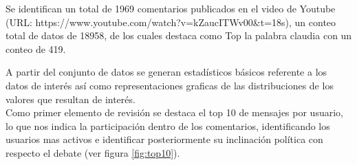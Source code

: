 Se identifican un total de 1969 comentarios publicados en el video de Youtube (URL: https://www.youtube.com/watch?v=kZaucITWv00\&t=18s), un conteo total de datos de 18958, de los cuales destaca como Top la palabra claudia con un conteo de 419.\\


\begin{table}[H]
	\centering
	\caption{}
	\label{tab:T1}
\end{table}

A partir del conjunto de datos se generan estadísticos básicos referente a los datos de interés así como representaciones graficas de las distribuciones de los valores que resultan de interés.\\
 
Como primer elemento de revisión se destaca el top 10 de mensajes por usuario, lo que nos indica la participación dentro de los comentarios, identificando los usuarios mas activos e identificar posteriormente su inclinación política con respecto el debate (ver figura \ref{fig:top10}).\\


